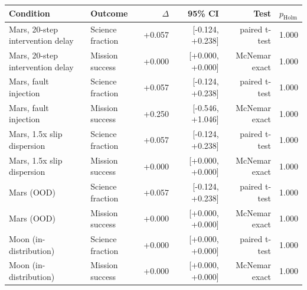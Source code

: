 \begin{tabular}{llrrrl}
\toprule
Condition & Outcome & $\Delta$ & 95\% CI & Test & $p_{\mathrm{Holm}}$ \\
\midrule
Mars, 20-step intervention delay & Science fraction & +0.057 & [-0.124, +0.238] & paired t-test & 1.000 \\
Mars, 20-step intervention delay & Mission success & +0.000 & [+0.000, +0.000] & McNemar exact & 1.000 \\
Mars, fault injection & Science fraction & +0.057 & [-0.124, +0.238] & paired t-test & 1.000 \\
Mars, fault injection & Mission success & +0.250 & [-0.546, +1.046] & McNemar exact & 1.000 \\
Mars, 1.5x slip dispersion & Science fraction & +0.057 & [-0.124, +0.238] & paired t-test & 1.000 \\
Mars, 1.5x slip dispersion & Mission success & +0.000 & [+0.000, +0.000] & McNemar exact & 1.000 \\
Mars (OOD) & Science fraction & +0.057 & [-0.124, +0.238] & paired t-test & 1.000 \\
Mars (OOD) & Mission success & +0.000 & [+0.000, +0.000] & McNemar exact & 1.000 \\
Moon (in-distribution) & Science fraction & +0.000 & [+0.000, +0.000] & paired t-test & 1.000 \\
Moon (in-distribution) & Mission success & +0.000 & [+0.000, +0.000] & McNemar exact & 1.000 \\
\bottomrule
\end{tabular}
